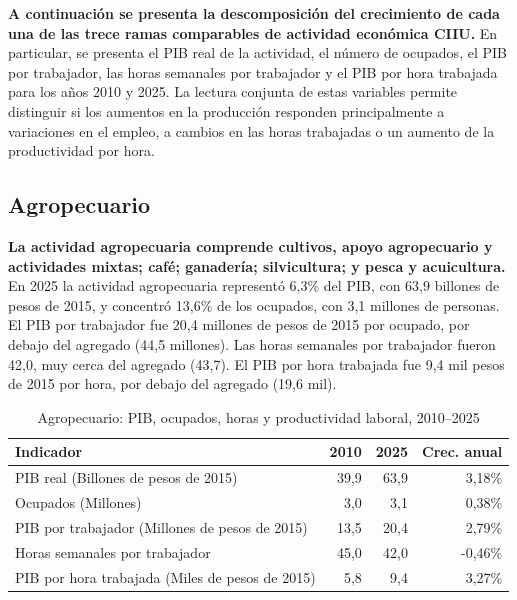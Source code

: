 \textbf{A continuación se presenta la descomposición del crecimiento de cada una de las trece ramas comparables de actividad económica CIIU.} En particular, se presenta el PIB real de la actividad, el número de ocupados, el PIB por trabajador, las horas semanales por trabajador y el PIB por hora trabajada para los años 2010 y 2025. La lectura conjunta de estas variables permite distinguir si los aumentos en la producción responden principalmente a variaciones en el empleo, a cambios en las horas trabajadas o un aumento de la productividad por hora.


\subsection{Agropecuario}

\textbf{La actividad agropecuaria comprende cultivos, apoyo agropecuario y actividades mixtas; café; ganadería; silvicultura; y pesca y acuicultura.} En 2025 la actividad agropecuaria representó 6,3\% del PIB, con 63,9 billones de pesos de 2015, y concentró 13,6\% de los ocupados, con 3,1 millones de personas. El PIB por trabajador fue 20,4 millones de pesos de 2015 por ocupado, por debajo del agregado (44,5 millones). Las horas semanales por trabajador fueron 42,0, muy cerca del agregado (43,7). El PIB por hora trabajada fue 9,4 mil pesos de 2015 por hora, por debajo del agregado (19,6 mil).

\begin{table}[H]
\centering
\caption{Agropecuario: PIB, ocupados, horas y productividad laboral, 2010--2025}
\label{tab:sector_a_productividad}
\small
\begin{tabular}{lrrr}
\toprule
Indicador & 2010 & 2025 & Crec. anual \\
\midrule
PIB real  (Billones de pesos de 2015) & 39,9 & 63,9 & 3,18\% \\
Ocupados (Millones) & 3,0 & 3,1 & 0,38\% \\
PIB por trabajador (Millones de pesos de 2015) & 13,5 & 20,4 & 2,79\% \\
Horas semanales por trabajador & 45,0 & 42,0 & -0,46\% \\
PIB por hora trabajada (Miles de pesos de 2015) & 5,8 & 9,4 & 3,27\% \\
\bottomrule
\end{tabular}
\end{table}

